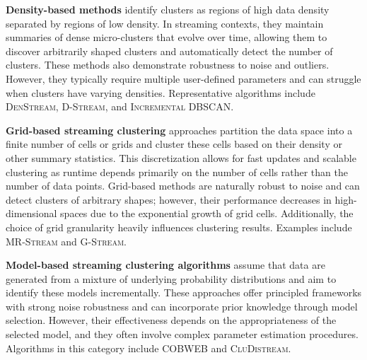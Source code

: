 \textbf{Density-based methods} identify clusters as regions of high data density separated by
regions of low density. In streaming contexts, they maintain summaries of dense micro-clusters
that evolve over time, allowing them to discover arbitrarily shaped clusters and automatically
detect the number of clusters. These methods also demonstrate robustness to noise and outliers.
However, they typically require multiple user-defined parameters and can struggle when clusters
have varying densities. Representative algorithms include \textsc{DenStream}, \textsc{D-Stream},
and \textsc{Incremental DBSCAN}.

\textbf{Grid-based streaming clustering} approaches partition the data space into a finite number
of cells or grids and cluster these cells based on their density or other summary statistics. This
discretization allows for fast updates and scalable clustering as runtime depends primarily on the
number of cells rather than the number of data points. Grid-based methods are naturally robust to
noise and can detect clusters of arbitrary shapes; however, their performance decreases in high-dimensional
spaces due to the exponential growth of grid cells. Additionally, the choice of grid granularity heavily
influences clustering results. Examples include \textsc{MR-Stream} and \textsc{G-Stream}.

\textbf{Model-based streaming clustering algorithms} assume that data are generated from a mixture of
underlying probability distributions and aim to identify these models incrementally. These approaches
offer principled frameworks with strong noise robustness and can incorporate prior knowledge through
model selection. However, their effectiveness depends on the appropriateness of the selected model,
and they often involve complex parameter estimation procedures. Algorithms in this category include
\textsc{COBWEB} and \textsc{CluDistream}.

